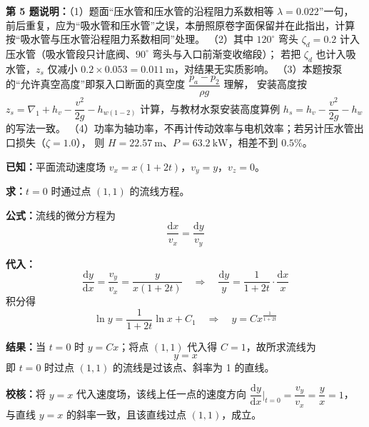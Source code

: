\begin{tishi}
\textbf{第 5 题说明：}（1）题面“压水管和压水管的沿程阻力系数相等 $\lambda=0.022$”一句，
前后重复，应为“吸水管和压水管”之误，本册照原卷字面保留并在此指出，计算按“吸水管与压水管沿程阻力系数相同”处理。
（2）其中 $120^\circ$ 弯头 $\zeta_d=0.2$ 计入压水管（吸水管段只计底阀、$90^\circ$ 弯头与入口前渐变收缩段）；
若把 $\zeta_d$ 也计入吸水管，$z_s$ 仅减小 $0.2\times0.053=0.011\ \mathrm{m}$，对结果无实质影响。
（3）本题按泵的“允许真空高度”即泵入口断面的真空度 $\dfrac{p_a-p_2}{\rho g}$ 理解，
安装高度按 $z_s=\nabla_1+h_v-\dfrac{v^{2}}{2g}-h_{w(1-2)}$ 计算，与教材水泵安装高度算例
$h_s=h_v-\dfrac{v^{2}}{2g}-h_w$ 的写法一致。
（4）功率为轴功率，不再计传动效率与电机效率；若另计压水管出口损失（$\zeta=1.0$），
则 $H=22.57\ \mathrm{m}$、$P=63.2\ \mathrm{kW}$，相差不到 $0.5\%$。
\end{tishi}


\begin{jie}
\textbf{已知：}平面流动速度场 $v_x=x(1+2t)$，$v_y=y$，$v_z=0$。

\textbf{求：}$t=0$ 时通过点 $(1,1)$ 的流线方程。

\textbf{公式：}流线的微分方程为
\[
\frac{\mathrm{d}x}{v_x}=\frac{\mathrm{d}y}{v_y}
\]

\textbf{代入：}
\[
\frac{\mathrm{d}y}{\mathrm{d}x}=\frac{v_y}{v_x}=\frac{y}{x(1+2t)}
\quad\Longrightarrow\quad
\frac{\mathrm{d}y}{y}=\frac{1}{1+2t}\cdot\frac{\mathrm{d}x}{x}
\]
积分得
\[
\ln y=\frac{1}{1+2t}\ln x+C_1
\quad\Longrightarrow\quad
y=Cx^{\frac{1}{1+2t}}
\]

\textbf{结果：}当 $t=0$ 时 $y=Cx$；将点 $(1,1)$ 代入得 $C=1$，故所求流线为
\[
\boxed{\,y=x\,}
\]
即 $t=0$ 时过点 $(1,1)$ 的流线是过该点、斜率为 1 的直线。

\textbf{校核：}将 $y=x$ 代入速度场，该线上任一点的速度方向
$\dfrac{\mathrm{d}y}{\mathrm{d}x}\Big|_{t=0}=\dfrac{v_y}{v_x}=\dfrac{y}{x}=1$，
与直线 $y=x$ 的斜率一致，且该直线过点 $(1,1)$，成立。
\end{jie}
